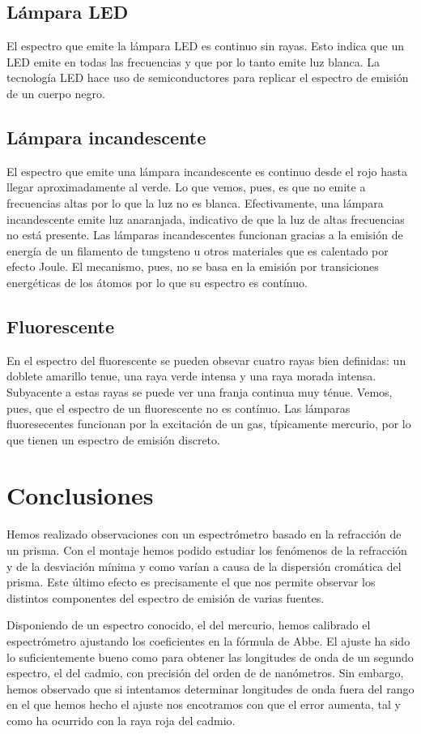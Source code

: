 \documentclass[12pt]{article}
\numberwithin{table}{section}
\numberwithin{figure}{section}
\numberwithin{equation}{section}
\begin{document}
\subsection{Lámpara LED}
El espectro que emite la lámpara LED es continuo sin rayas. Esto indica que un LED emite en todas las frecuencias y que por lo tanto emite luz blanca. La tecnología LED hace uso de semiconductores para replicar el  espectro de emisión de un cuerpo negro.

\subsection{Lámpara incandescente}
El espectro que emite una lámpara incandescente es continuo desde el rojo hasta llegar aproximadamente al verde. Lo que vemos, pues, es que no emite a frecuencias altas por lo que la luz no es blanca. Efectivamente, una lámpara incandescente emite luz anaranjada, indicativo de que la luz de altas frecuencias no está presente. Las lámparas incandescentes funcionan gracias a la emisión de energía de un filamento de tungsteno u otros materiales que es calentado por efecto Joule. El mecanismo, pues, no se basa en la emisión por transiciones energéticas de los átomos por lo que su espectro es contínuo.

\subsection{Fluorescente}
En el espectro del fluorescente se pueden obsevar cuatro rayas bien definidas: un doblete amarillo tenue, una raya verde intensa y una raya morada intensa. Subyacente a estas rayas se puede ver una franja continua muy ténue. Vemos, pues, que el espectro de un fluorescente no es contínuo. Las lámparas fluoresecentes funcionan por la excitación de un gas, típicamente mercurio, por lo que tienen un espectro de emisión discreto.

\section{Conclusiones}
Hemos realizado observaciones con un espectrómetro basado en la refracción de un prisma. Con el montaje hemos podido estudiar los fenómenos de la refracción y de la desviación mínima y como varían a causa de la dispersión cromática del prisma. Este último efecto es precisamente el que nos permite observar los distintos componentes del espectro de emisión de varias fuentes.

Disponiendo de un espectro conocido, el del mercurio, hemos calibrado el espectrómetro ajustando los coeficientes en la fórmula de Abbe. El ajuste ha sido lo suficientemente bueno como para obtener las longitudes de onda de un segundo espectro, el del cadmio, con precisión del orden de de nanómetros. Sin embargo, hemos observado que si intentamos determinar longitudes de onda fuera del rango en el que hemos hecho el ajuste nos encotramos con que el error aumenta, tal y como ha ocurrido con la raya roja del cadmio.
\end{document}
